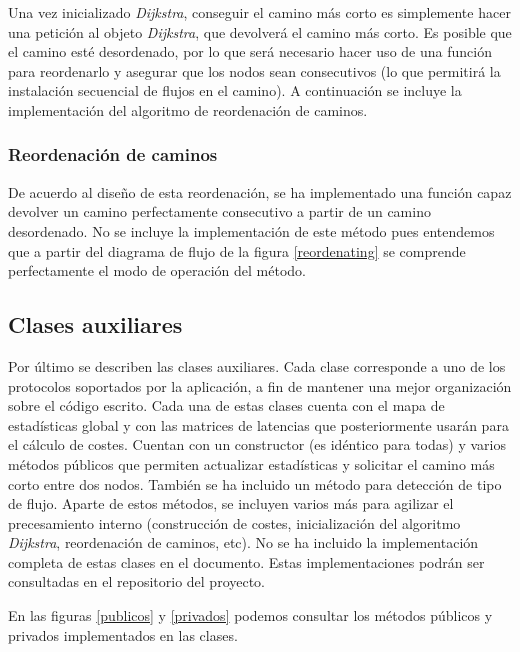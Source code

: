 \documentclass[a4paper,11pt]{book}
\begin{document}
Una vez inicializado \textit{Dijkstra}, conseguir el camino más corto es simplemente hacer una petición al objeto \textit{Dijkstra}, que devolverá el camino más corto. Es posible que el camino esté desordenado, por lo que será necesario hacer uso de una función para reordenarlo y asegurar que los nodos sean consecutivos (lo que permitirá la instalación secuencial de flujos en el camino). A continuación se incluye la implementación del algoritmo de reordenación de caminos.

\subsubsection{Reordenación de caminos}
De acuerdo al diseño de esta reordenación, se ha implementado una función capaz devolver un camino perfectamente consecutivo a partir de un camino desordenado. No se incluye la implementación de este método pues entendemos que a partir del diagrama de flujo de la figura \ref{reordenating} se comprende perfectamente el modo de operación del método.

\subsection{Clases auxiliares}
Por último se describen las clases auxiliares. Cada clase corresponde a uno de los protocolos soportados por la aplicación, a fin de mantener una mejor organización sobre el código escrito. Cada una de estas clases cuenta con el mapa de estadísticas global y con las matrices de latencias que posteriormente usarán para el cálculo de costes. Cuentan con un constructor (es idéntico para todas) y varios métodos públicos que permiten actualizar estadísticas y solicitar el camino más corto entre dos nodos. También se ha incluido un método para detección de tipo de flujo. Aparte de estos métodos, se incluyen varios más para agilizar el precesamiento interno (construcción de costes, inicialización del algoritmo \textit{Dijkstra}, reordenación de caminos, etc). No se ha incluido la implementación completa de estas clases en el documento. Estas implementaciones podrán ser consultadas en el repositorio del proyecto.

En las figuras \ref{publicos} y \ref{privados} podemos consultar los métodos públicos y privados implementados en las clases.
\end{document}
